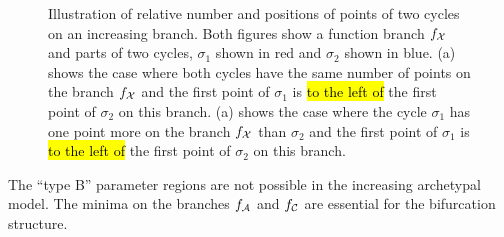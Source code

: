 \begin{figure}
	\centering
	 \quad
	\caption[Illustration of relative number and positions of points of two cycles on an increasing branch]{
		Illustration of relative number and positions of points of two cycles on an increasing branch.
		Both figures show a function branch $f_{\mathcal{X}}$ and parts of two cycles, $\sigma_1$ shown in red and $\sigma_2$ shown in blue.
		(a) shows the case where both cycles have the same number of points on the branch $f_{\mathcal{X}}$ and the first point of $\sigma_1$ is \hl{to the left of} the first point of $\sigma_2$ on this branch.
		(a) shows the case where the cycle $\sigma_1$ has one point more on the branch $f_{\mathcal{X}}$ than $\sigma_2$ and the first point of $\sigma_1$ is \hl{to the left of} the first point of $\sigma_2$ on this branch.
	}
	\label{fig:add.change.increasing}
\end{figure}

\begin{theorem}
	The ``type B'' parameter regions are not possible in the increasing archetypal model.
	The minima on the branches $f_{\mathcal{A}}$ and $f_{\mathcal{C}}$ are essential for the bifurcation structure.
\end{theorem}

